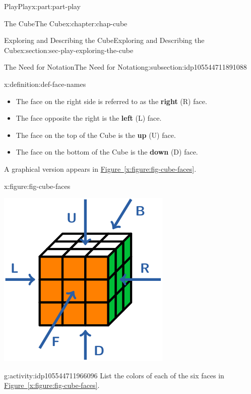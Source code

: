 \documentclass[oneside,10pt,]{book}
\newcommand{\xreffont}{\relax}
\newcommand{\terminology}[1]{\textbf{#1}}
\numberwithin{equation}{section}
\begin{document}
\begin{partptx}{Play}{}{Play}{}{}{x:part:part-play}
\begin{chapterptx}{The Cube}{}{The Cube}{}{}{x:chapter:chap-cube}
\begin{sectionptx}{Exploring and Describing the Cube}{}{Exploring and Describing the Cube}{}{}{x:section:sec-play-exploring-the-cube}
\begin{subsectionptx}{The Need for Notation}{}{The Need for Notation}{}{}{g:subsection:idp105544711891088}
\begin{definition}{}{x:definition:def-face-names}
\begin{itemize}[label=\textbullet]
\item{}The face on the right side is referred to as the \terminology{right} (R) face.%
\item{}The face opposite the right is the \terminology{left} (L) face.%
\item{}The face on the top of the Cube is the \terminology{up} (U) face.%
\item{}The face on the bottom of the Cube is the \terminology{down} (D) face.%
\end{itemize}
A graphical version appears in \hyperref[x:figure:fig-cube-faces]{Figure~{\xreffont\ref{x:figure:fig-cube-faces}}}.%
\begin{figureptx}{}{x:figure:fig-cube-faces}{}%
\begin{image}{0.25}{0.5}{0.25}%
\includegraphics[width=\linewidth]{./images/faces.svg}
\end{image}%
\tcblower
\end{figureptx}%
\end{definition}
\begin{activity}{}{g:activity:idp105544711966096}%
List the colors of each of the six faces in \hyperref[x:figure:fig-cube-faces]{Figure~{\xreffont\ref{x:figure:fig-cube-faces}}}.%
\end{activity}%

\end{subsectionptx}
\end{sectionptx}
\end{chapterptx}
\end{partptx}
\end{document}
